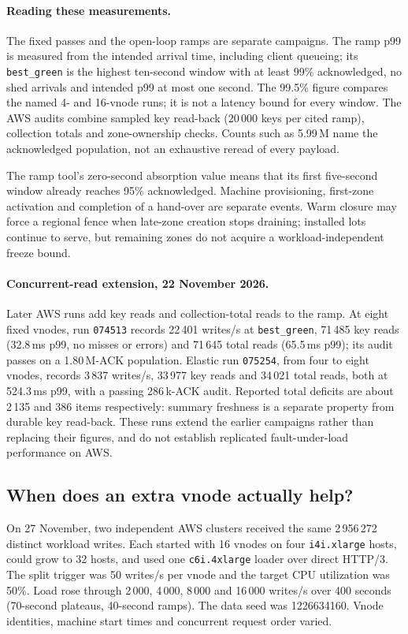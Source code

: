 \documentclass[11pt]{article}
\begin{document}
\paragraph{Reading these measurements.}
The fixed passes and the open-loop ramps are separate campaigns. The ramp p99 is measured from the intended arrival time, including client queueing; its \texttt{best\_green} is the highest ten-second window with at least 99\% acknowledged, no shed arrivals and intended p99 at most one second. The 99.5\% figure compares the named 4- and 16-vnode runs; it is not a latency bound for every window. The AWS audits combine sampled key read-back (20\,000 keys per cited ramp), collection totals and zone-ownership checks. Counts such as 5.99\,M name the acknowledged population, not an exhaustive reread of every payload.

The ramp tool's zero-second absorption value means that its first five-second window already reaches 95\% acknowledged. Machine provisioning, first-zone activation and completion of a hand-over are separate events. Warm closure may force a regional fence when late-zone creation stops draining; installed lots continue to serve, but remaining zones do not acquire a workload-independent freeze bound.

\paragraph{Concurrent-read extension, 22 November 2026.}
Later AWS runs add key reads and collection-total reads to the ramp. At eight fixed vnodes, run \texttt{074513} records 22\,401 writes/s at \texttt{best\_green}, 71\,485 key reads (32.8\,ms p99, no misses or errors) and 71\,645 total reads (65.5\,ms p99); its audit passes on a 1.80\,M-ACK population. Elastic run \texttt{075254}, from four to eight vnodes, records 3\,837 writes/s, 33\,977 key reads and 34\,021 total reads, both at 524.3\,ms p99, with a passing 286\,k-ACK audit. Reported total deficits are about 2\,135 and 386 items respectively: summary freshness is a separate property from durable key read-back. These runs extend the earlier campaigns rather than replacing their figures, and do not establish replicated fault-under-load performance on AWS.

\subsection{When does an extra vnode actually help?}\hypertarget{ix:elasticity}{}
On 27 November, two independent AWS clusters received the same 2\,956\,272 distinct workload writes. Each started with 16 vnodes on four \texttt{i4i.xlarge} hosts, could grow to 32 hosts, and used one \texttt{c6i.4xlarge} loader over direct HTTP/3. The split trigger was 50 writes/s per vnode and the target CPU utilization was 50\%. Load rose through 2\,000, 4\,000, 8\,000 and 16\,000 writes/s over 400 seconds (70-second plateaus, 40-second ramps). The data seed was 1226634160. Vnode identities, machine start times and concurrent request order varied.
\end{document}
